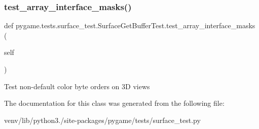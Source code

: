 \subsubsection{\texorpdfstring{test\+\_\+array\+\_\+interface\+\_\+masks()}{test\_array\_interface\_masks()}}
{\footnotesize\ttfamily def pygame.\+tests.\+surface\+\_\+test.\+Surface\+Get\+Buffer\+Test.\+test\+\_\+array\+\_\+interface\+\_\+masks (\begin{DoxyParamCaption}\item[{}]{self }\end{DoxyParamCaption})}

\begin{DoxyVerb}Test non-default color byte orders on 3D views\end{DoxyVerb}
 

The documentation for this class was generated from the following file\+:\begin{DoxyCompactItemize}
\item 
venv/lib/python3./site-\/packages/pygame/tests/surface\+\_\+test.\+py\end{DoxyCompactItemize}
